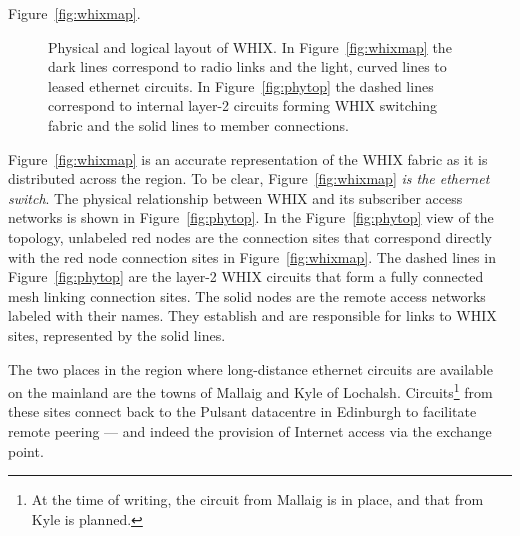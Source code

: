 Figure~\ref{fig:whixmap}.
\begin{figure*}
  \centering
  \hspace{\columnsep}
  \caption{Physical and logical layout of \ac{WHIX}. In
  Figure~\ref{fig:whixmap} the dark lines correspond to radio links
  and the light, curved lines to leased ethernet circuits.
  In Figure~\ref{fig:phytop} the dashed lines
  correspond to internal layer-2 circuits forming \ac{WHIX}
  switching fabric and the solid lines to member connections.}
\end{figure*}

Figure~\ref{fig:whixmap} is an accurate representation of the WHIX fabric as it
is distributed across the region. To be clear, Figure~\ref{fig:whixmap} \emph{is
the ethernet switch}. The physical relationship between WHIX and its subscriber
access networks is shown in Figure~\ref{fig:phytop}.
In the Figure~\ref{fig:phytop} view of the topology, unlabeled red nodes are the
connection sites that correspond directly with the red node connection sites in
Figure~\ref{fig:whixmap}. The dashed lines in Figure~\ref{fig:phytop} are the
layer-2 WHIX circuits that form a fully connected mesh linking connection sites.
The solid nodes are the remote access networks labeled with their names. They
establish and are responsible for links to WHIX sites, represented by the solid
lines.

The two places in the region where long-distance ethernet circuits are
available on the mainland are the towns of Mallaig and Kyle of
Lochalsh. Circuits\footnote{At the time of writing, the circuit from
Mallaig is in place, and that from Kyle is planned.} from these sites
connect back to the Pulsant datacentre in Edinburgh to facilitate
remote peering --- and indeed the provision of Internet access via the
exchange point.


